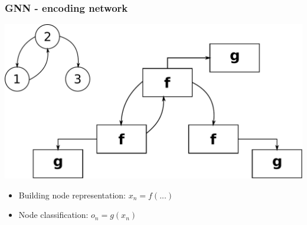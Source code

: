 \documentclass{beamer}
\begin{document}
\begin{frame}
\frametitle{GNN - encoding network}
\begin{center}
	\includegraphics[scale=0.4]{img/encodinginc}
\end{center}
\begin{itemize}
	\item Building node representation: $x_n = f(...)$
	\item Node classification: $o_n = g(x_n)$
\end{itemize}
\end{frame}
\end{document}
